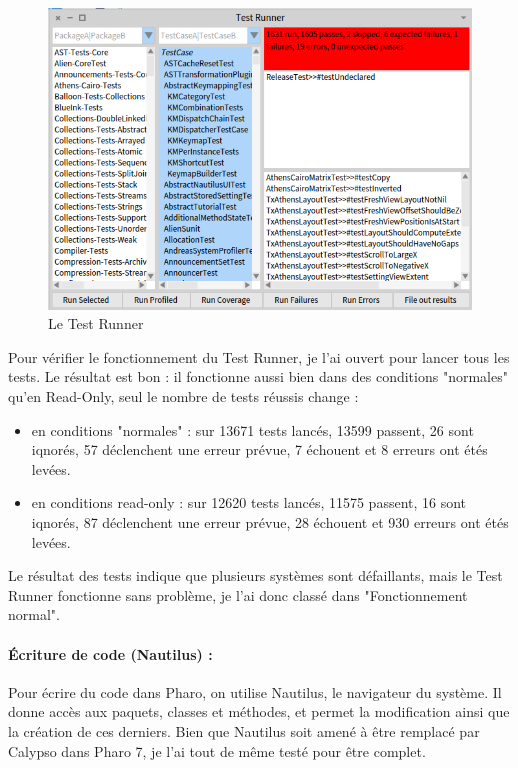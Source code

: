\begin{figure}[h]
	\includegraphics[width=\linewidth]{./img/testrunner.png}
	\caption[testrunner]{Le Test Runner}
\end{figure}

Pour vérifier le fonctionnement du Test Runner, je l'ai ouvert pour lancer tous les tests. Le résultat est bon : il fonctionne aussi bien dans des conditions "normales" qu'en Read-Only, seul le nombre de tests réussis change :
\begin{itemize}
	\item en conditions "normales" : sur 13671 tests lancés, 13599 passent, 26 sont iqnorés, 57 déclenchent une erreur prévue, 7 échouent et 8 erreurs ont étés levées.
	\item en conditions read-only : sur 12620 tests lancés, 11575 passent, 16 sont iqnorés, 87 déclenchent une erreur prévue, 28 échouent et 930 erreurs ont étés levées.
\end{itemize}

Le résultat des tests indique que plusieurs systèmes sont défaillants, mais le Test Runner fonctionne sans problème, je l'ai donc classé dans "Fonctionnement normal".

\paragraph{Écriture de code (Nautilus) :}
Pour écrire du code dans Pharo, on utilise Nautilus, le navigateur du système. Il donne accès aux paquets, classes et méthodes, et permet la modification ainsi que la création de ces derniers. Bien que Nautilus soit amené à être remplacé par Calypso dans Pharo 7, je l'ai tout de même testé pour être complet.

